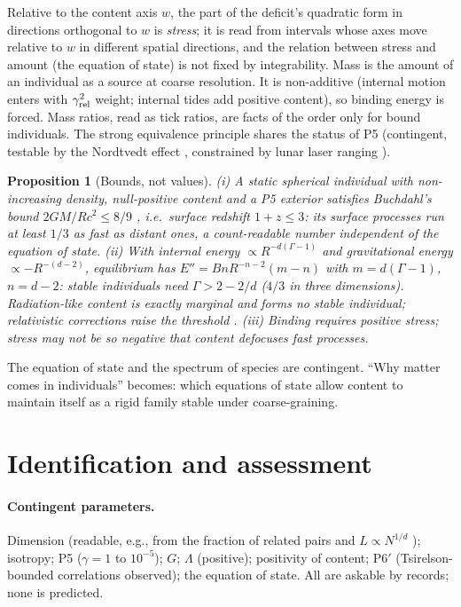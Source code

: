 \documentclass[11pt]{article}
\newtheorem{proposition}[theorem]{Proposition}
\theoremstyle{definition}
\theoremstyle{remark}
\begin{document}
Relative to the content axis $w$, the part of the deficit's quadratic form in directions orthogonal to $w$ is \emph{stress}; it is read from intervals whose axes move relative to $w$ in different spatial directions, and the relation between stress and amount (the equation of state) is not fixed by integrability. Mass is the amount of an individual as a source at coarse resolution. It is non-additive (internal motion enters with $\gamma_{\rm rel}^2$ weight; internal tides add positive content), so binding energy is forced. Mass ratios, read as tick ratios, are facts of the order only for bound individuals. The strong equivalence principle shares the status of P5 (contingent, testable by the Nordtvedt effect \cite{nordtvedt}, constrained by lunar laser ranging \cite{llr}).

\begin{proposition}[Bounds, not values]
(i) A static spherical individual with non-increasing density, null-positive content and a P5 exterior satisfies Buchdahl's bound $2GM/Rc^2\le8/9$ \cite{buchdahl}, i.e.\ surface redshift $1+z\le3$: its surface processes run at least $1/3$ as fast as distant ones, a count-readable number independent of the equation of state. (ii) With internal energy $\propto R^{-d(\Gamma-1)}$ and gravitational energy $\propto-R^{-(d-2)}$, equilibrium has $E''=Bn R^{-n-2}(m-n)$ with $m=d(\Gamma-1)$, $n=d-2$: stable individuals need $\Gamma>2-2/d$ ($4/3$ in three dimensions). Radiation-like content is exactly marginal and forms no stable individual; relativistic corrections raise the threshold \cite{chandrasekhar64}. (iii) Binding requires positive stress; stress may not be so negative that content defocuses fast processes.
\end{proposition}

The equation of state and the spectrum of species are contingent. ``Why matter comes in individuals'' becomes: which equations of state allow content to maintain itself as a rigid family stable under coarse-graining.

\section{Identification and assessment}\label{sec:assess}

\paragraph{Contingent parameters.} Dimension (readable, e.g., from the fraction of related pairs \cite{myrheim,meyer} and $L\propto N^{1/d}$ \cite{bollobaswinkler}); isotropy; P5 ($\gamma=1$ to $10^{-5}$); $G$; $\Lambda$ (positive); positivity of content; P6$'$ (Tsirelson-bounded correlations observed); the equation of state. All are askable by records; none is predicted.
\end{document}
